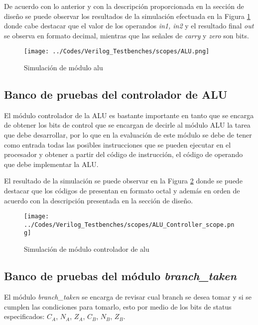 De acuerdo con lo anterior y con la descripci\' on proporcionada en la secci\' on de dise\~ no se puede observar los resultados de la simulaci\' on efectuada en la Figura \ref{fig:alu} donde cabe destacar que el valor de los operandos \textit{in1, in2} y el resultado final \textit{out} se observa en formato decimal, mientras que las se\~ nales de \textit{carry} y \textit{zero} son bits.


\begin{figure}[hbtp]
\caption{Simulaci\' on de m\' odulo alu}
\centering
\texttt{[image: ../Codes/Verilog\_Testbenches/scopes/ALU.png]}
\label{fig:alu}
\end{figure}

\subsection{Banco de pruebas del controlador de ALU}
El m\' odulo controlador de la ALU es bastante importante en tanto que se encarga de obtener los bits de control que se encargan de decirle al m\' odulo ALU la tarea que debe desarrollar, por lo que en la evaluaci\' on de este m\' odulo se debe de tener como entrada todas las posibles instrucciones que se pueden ejecutar en el procesador y obtener a partir del c\' odigo de instrucci\' on, el c\' odigo de operando que debe implementar la ALU.

El resultado de la simulaci\' on se puede observar en la Figura \ref{fig:aluControl} donde se puede destacar que los c\' odigos de presentan en formato octal y adem\' as en orden de acuerdo con la descripci\' on presentada en la secci\' on de dise\~ no.

\begin{figure}[hbtp]
\caption{Simulaci\' on de m\' odulo controlador de alu}
\centering
\texttt{[image: ../Codes/Verilog\_Testbenches/scopes/ALU\_Controller\_scope.png]}
\label{fig:aluControl}
\end{figure}


\subsection{Banco de pruebas del m\' odulo \textit{branch\_taken}}
El m\'odulo \textit{branch\_taken} se encarga de revisar cual branch se desea tomar y si se cumplen las condiciones para tomarlo, esto por medio de los bits de status especificados: $C_{A}$, $N_{A}$, $Z_{A}$, $C_{B}$, $N_{B}$, $Z_{B}$.\\

